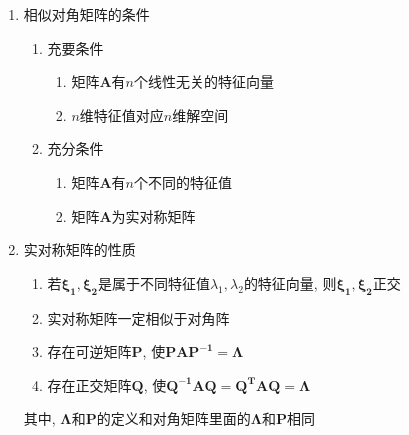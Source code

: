 \begin{enumerate}
\item 相似对角矩阵的条件
\begin{enumerate}
\item 充要条件
\begin{enumerate}
\item 矩阵$\bm{A}$有$n$个线性无关的特征向量
\item $n$维特征值对应$n$维解空间
\end{enumerate}
\item 充分条件
\begin{enumerate}
\item 矩阵$\bm{A}$有$n$个不同的特征值
\item 矩阵$\bm{A}$为实对称矩阵
\end{enumerate}
\end{enumerate}
\item 实对称矩阵的性质
\begin{enumerate}
\item 若$\bm{\xi_{1}},\bm{\xi_{2}}$是属于不同特征值$\lambda_{1},\lambda_{2}$的特征向量, 则$\bm{\xi_{1}},\bm{\xi_{2}}$正交
\item 实对称矩阵一定相似于对角阵
\item 存在可逆矩阵$\bm{P}$, 使$\bm{P}\bm{A}\bm{P^{-1}}=\bm{\Lambda}$
\item 存在正交矩阵$\bm{Q}$, 使$\bm{Q^{-1}}\bm{A}\bm{Q}=\bm{Q^{T}}\bm{A}\bm{Q}=\bm{\Lambda}$
\end{enumerate}
其中, $\bm{\Lambda}$和$\bm{P}$的定义和对角矩阵里面的$\bm{\Lambda}$和$\bm{P}$相同
\end{enumerate}